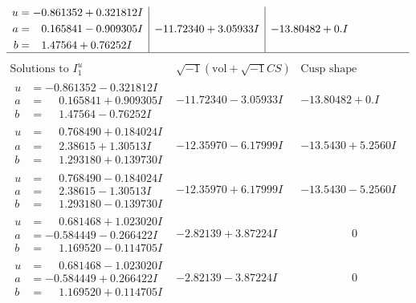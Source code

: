 \documentclass[1p]{elsarticle_modified}
\theoremstyle{definition}
\newcommand{\I}{\sqrt{-1}}
\begin{document}
$$\begin{array}{c|c|c}
\begin{aligned}
u &= -0.861352 + 0.321812 I \\
a &= \phantom{-}0.165841 - 0.909305 I \\
b &= \phantom{-}1.47564 + 0.76252 I\end{aligned}
 & -11.72340 + 3.05933 I & -13.80482 + 0. I\phantom{ +0.000000I}\\
 \hline 
 \end{array}$$\newpage$$\begin{array}{c|c|c}  
\text{Solutions to }I^u_{1}& \I (\text{vol} + \sqrt{-1}CS) & \text{Cusp shape}\\
 \hline 
\begin{aligned}
u &= -0.861352 - 0.321812 I \\
a &= \phantom{-}0.165841 + 0.909305 I \\
b &= \phantom{-}1.47564 - 0.76252 I\end{aligned}
 & -11.72340 - 3.05933 I & -13.80482 + 0. I\phantom{ +0.000000I} \\ \hline\begin{aligned}
u &= \phantom{-}0.768490 + 0.184024 I \\
a &= \phantom{-}2.38615 + 1.30513 I \\
b &= \phantom{-}1.293180 + 0.139730 I\end{aligned}
 & -12.35970 - 6.17999 I & -13.5430 + 5.2560 I \\ \hline\begin{aligned}
u &= \phantom{-}0.768490 - 0.184024 I \\
a &= \phantom{-}2.38615 - 1.30513 I \\
b &= \phantom{-}1.293180 - 0.139730 I\end{aligned}
 & -12.35970 + 6.17999 I & -13.5430 - 5.2560 I \\ \hline\begin{aligned}
u &= \phantom{-}0.681468 + 1.023020 I \\
a &= -0.584449 - 0.266422 I \\
b &= \phantom{-}1.169520 - 0.114705 I\end{aligned}
 & -2.82139 + 3.87224 I & \phantom{-0.000000 } 0 \\ \hline\begin{aligned}
u &= \phantom{-}0.681468 - 1.023020 I \\
a &= -0.584449 + 0.266422 I \\
b &= \phantom{-}1.169520 + 0.114705 I\end{aligned}
 & -2.82139 - 3.87224 I & \phantom{-0.000000 } 0 \\ \hline\begin{aligned}

\end{aligned}
\end{array}$$
\end{document}
